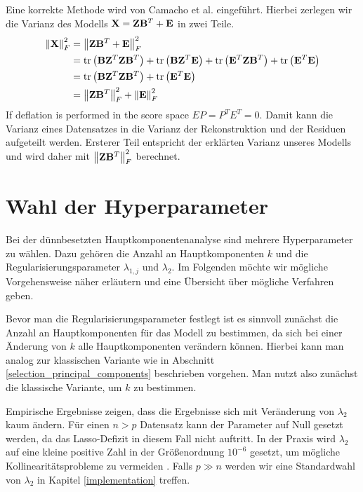 Eine korrekte Methode wird von Camacho et al. eingeführt. Hierbei zerlegen wir die Varianz des Modells $\mathbf{X} = \mathbf{Z} \mathbf{B}^T + \mathbf{E}$ in zwei Teile.
\begin{align}
\label{camacho_explained_variance}
\left\lVert \mathbf{X} \right\rVert_F^2 & = \left\lVert \mathbf{Z} \mathbf{B}^T + \mathbf{E} \right\rVert_{F}^{2} \nonumber\\
& = \text{tr} \left( \mathbf{B} \mathbf{Z}^T \mathbf{Z} \mathbf{B}^T \right) + \text{tr} \left( \mathbf{B} \mathbf{Z}^T \mathbf{E} \right) + \text{tr} \left( \mathbf{E}^T\mathbf{Z} \mathbf{B}^T \right) + \text{tr} \left( \mathbf{E}^T \mathbf{E} \right) \nonumber\\
& = \text{tr} \left( \mathbf{B} \mathbf{Z}^T \mathbf{Z} \mathbf{B}^T \right) + \text{tr} \left( \mathbf{E}^T \mathbf{E} \right) \nonumber\\
& = \left\lVert \mathbf{Z} \mathbf{B}^T \right\rVert_{F}^{2} + \left\lVert \mathbf{E} \right\rVert_{F}^{2}
\end{align}
If deflation is performed in the score space $EP = P^T E^T = 0$.
Damit kann die Varianz eines Datensatzes in die Varianz der Rekonstruktion und der Residuen aufgeteilt werden. Ersterer Teil entspricht der erklärten Varianz unseres Modells und wird daher mit $\left\lVert \mathbf{Z} \mathbf{B}^T \right\rVert_{F}^{2}$ berechnet.



\section{Wahl der Hyperparameter}
\label{choice_of_tuning_parameters}

Bei der dünnbesetzten Hauptkomponentenanalyse sind mehrere Hyperparameter zu wählen. Dazu gehören die Anzahl an Hauptkomponenten $k$ und die Regularisierungsparameter $\lambda_{1,j}$ und $\lambda_2$. Im Folgenden möchte wir mögliche Vorgehensweise näher erläutern und eine Übersicht über mögliche Verfahren geben. 

Bevor man die Regularisierungsparameter festlegt ist es sinnvoll zunächst die Anzahl an Hauptkomponenten für das Modell zu bestimmen, da sich bei einer Änderung von $k$ alle Hauptkomponenten verändern können. Hierbei kann man analog zur klassischen Variante wie in Abschnitt \ref{selection_principal_components} beschrieben vorgehen. Man nutzt also zunächst die klassische Variante, um $k$ zu bestimmen.

Empirische Ergebnisse zeigen, dass die Ergebnisse sich mit Veränderung von $\lambda_2$ kaum ändern. Für einen $n > p$ Datensatz kann der Parameter auf Null gesetzt werden, da das Lasso-Defizit in diesem Fall nicht auftritt. In der Praxis wird $\lambda_2$ auf eine kleine positive Zahl in der Größenordnung $10^{-6}$ gesetzt, um mögliche Kollinearitätsprobleme zu vermeiden \cite{zou_sparsepca}. Falls $p \gg n$ werden wir eine Standardwahl von $\lambda_2$ in Kapitel \ref{implementation} treffen.


